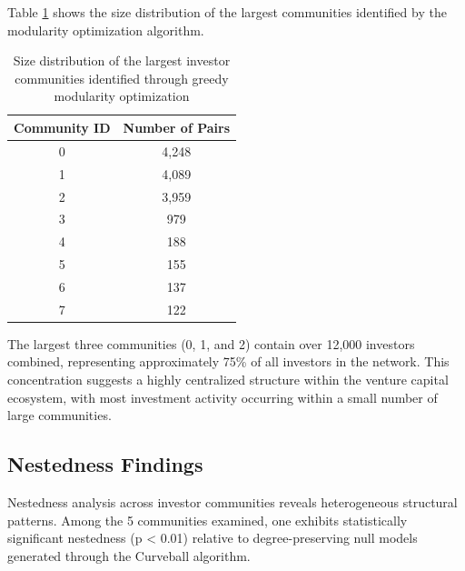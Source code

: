 Table \ref{tab:community_sizes} shows the size distribution of the largest communities identified by the modularity optimization algorithm.


\begin{table}[htbp]
\centering
\begin{tabular}{|c|c|}
\hline
\textbf{Community ID} & \textbf{Number of Pairs} \\
\hline
0 & 4,248 \\
1 & 4,089 \\
2 & 3,959 \\
3 & 979 \\
4 & 188 \\
5 & 155 \\
6 & 137 \\
7 & 122 \\
\hline
\end{tabular}
\caption{Size distribution of the largest investor communities identified through greedy modularity optimization}
\label{tab:community_sizes}
\end{table}

The largest three communities (0, 1, and 2) contain over 12,000 investors combined, representing approximately 75\% of all investors in the network. This concentration suggests a highly centralized structure within the venture capital ecosystem, with most investment activity occurring within a small number of large communities. 




\subsection{Nestedness Findings}

\newcommand{\numCommAnalysedNestedness}{5}

Nestedness analysis across investor communities reveals heterogeneous structural patterns. Among the \numCommAnalysedNestedness{} communities examined, one exhibits statistically significant nestedness (p < 0.01) relative to degree-preserving null models generated through the Curveball algorithm.

